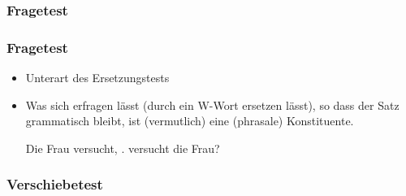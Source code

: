 \subsubsection{Fragetest}


\begin{frame}
\frametitle{Fragetest}

\begin{itemize}
	\item Unterart des Ersetzungstests
	\medskip
	\item Was sich erfragen lässt (durch ein W-Wort ersetzen lässt), so dass der Satz grammatisch bleibt, ist (vermutlich) eine (phrasale) Konstituente.

	\eal 
	\zl

\pause	
	\eal 
	\ex Die Frau versucht, .
	\ex \alertred{[Was]} versucht die Frau?
	\zl
	
\end{itemize}

\nocite{MyP18j}

\end{frame}


\subsubsection{Verschiebetest}



